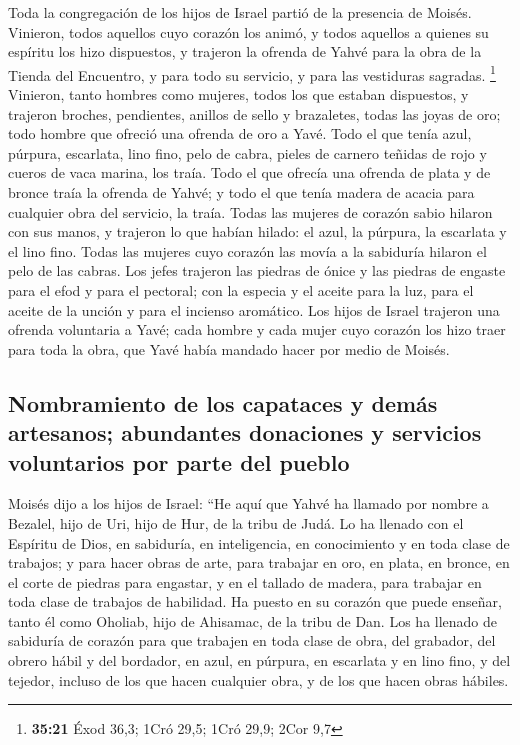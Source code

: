 \begin{paracol}{2}
 Toda la congregación de los hijos de Israel partió de la
presencia de Moisés.  Vinieron, todos aquellos cuyo
corazón los animó, y todos aquellos a quienes su espíritu los hizo
dispuestos, y trajeron la ofrenda de Yahvé para la obra de la Tienda del
Encuentro, y para todo su servicio, y para las vestiduras sagradas.
\footnote{\textbf{35:21} Éxod 36,3; 1Cró 29,5; 1Cró 29,9; 2Cor 9,7}
 Vinieron, tanto hombres como mujeres, todos los que
estaban dispuestos, y trajeron broches, pendientes, anillos de sello y
brazaletes, todas las joyas de oro; todo hombre que ofreció una ofrenda
de oro a Yavé.  Todo el que tenía azul, púrpura,
escarlata, lino fino, pelo de cabra, pieles de carnero teñidas de rojo y
cueros de vaca marina, los traía.  Todo el que ofrecía
una ofrenda de plata y de bronce traía la ofrenda de Yahvé; y todo el
que tenía madera de acacia para cualquier obra del servicio, la traía.
 Todas las mujeres de corazón sabio hilaron con sus
manos, y trajeron lo que habían hilado: el azul, la púrpura, la
escarlata y el lino fino.  Todas las mujeres cuyo corazón
las movía a la sabiduría hilaron el pelo de las cabras. 
Los jefes trajeron las piedras de ónice y las piedras de engaste para el
efod y para el pectoral;  con la especia y el aceite para
la luz, para el aceite de la unción y para el incienso aromático.
 Los hijos de Israel trajeron una ofrenda voluntaria a
Yavé; cada hombre y cada mujer cuyo corazón los hizo traer para toda la
obra, que Yavé había mandado hacer por medio de Moisés.

\hypertarget{nombramiento-de-los-capataces-y-demuxe1s-artesanos-abundantes-donaciones-y-servicios-voluntarios-por-parte-del-pueblo}{%
\subsection{Nombramiento de los capataces y demás artesanos; abundantes
donaciones y servicios voluntarios por parte del
pueblo}\label{nombramiento-de-los-capataces-y-demuxe1s-artesanos-abundantes-donaciones-y-servicios-voluntarios-por-parte-del-pueblo}}

 Moisés dijo a los hijos de Israel: ``He aquí que Yahvé
ha llamado por nombre a Bezalel, hijo de Uri, hijo de Hur, de la tribu
de Judá.  Lo ha llenado con el Espíritu de Dios, en
sabiduría, en inteligencia, en conocimiento y en toda clase de trabajos;
 y para hacer obras de arte, para trabajar en oro, en
plata, en bronce,  en el corte de piedras para engastar,
y en el tallado de madera, para trabajar en toda clase de trabajos de
habilidad.  Ha puesto en su corazón que puede enseñar,
tanto él como Oholiab, hijo de Ahisamac, de la tribu de Dan.
 Los ha llenado de sabiduría de corazón para que trabajen
en toda clase de obra, del grabador, del obrero hábil y del bordador, en
azul, en púrpura, en escarlata y en lino fino, y del tejedor, incluso de
los que hacen cualquier obra, y de los que hacen obras hábiles.


\end{paracol}
